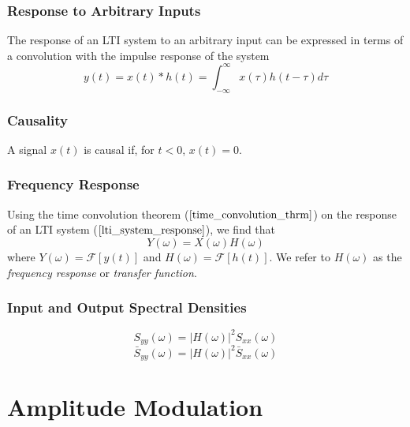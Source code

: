 \documentclass[]{article}
\begin{document}
\begin{multicols}{2}
\subsubsection{Response to Arbitrary Inputs}
The response of an LTI system to an arbitrary input can be expressed in terms of a convolution with the impulse response of the system
\begin{equation}y(t) = x(t)*h(t)=\int_{-\infty}^{\infty}x(\tau)h(t-\tau)d\tau\label{lti_system_response} \end{equation}
\subsubsection{Causality}
A signal $x(t)$ is causal if, for $t<0$, $x(t)=0$.
\subsubsection{Frequency Response}
Using the time convolution theorem ($\ref{time_convolution_thrm}$) on the response of an LTI system ($\ref{lti_system_response}$), we find that
\begin{equation} Y(\omega) = X(\omega)H(\omega) \label{freq_response} \end{equation}
where $Y(\omega)=\mathscr{F}[y(t)]$ and $H(\omega)=\mathscr{F}[h(t)]$. We refer to $H(\omega)$ as the \textit{frequency response} or \textit{transfer function}.
\subsubsection{Input and Output Spectral Densities}
\begin{equation} S_{yy}(\omega) = |H(\omega)|^{2} S_{xx}(\omega)  \end{equation}
\begin{equation}\bar{S}_{yy}(\omega) = |H(\omega)|^{2} \bar{S}_{xx}(\omega)  \end{equation}

\end{multicols}

\section{Amplitude Modulation}
\begin{multicols}{2}

\end{multicols}
\end{document}
